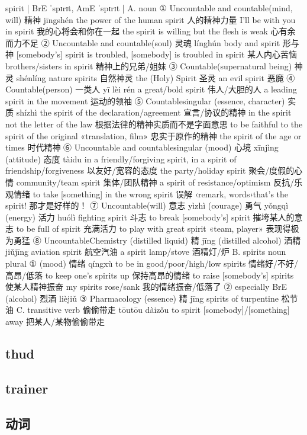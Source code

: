 \documentclass[11pt]{ctexart}
\begin{document}
{{{{spirit | BrE ˈspɪrɪt, AmE ˈspɪrɪt |
A. noun
① Uncountable and countable(mind, will) 精神 jīngshén the power of the human spirit 人的精神力量 I'll be with you in spirit 我的心将会和你在一起 the spirit is willing but the flesh is weak 心有余而力不足
② Uncountable and countable(soul) 灵魂 línghún body and spirit 形与神 [somebody's] spirit is troubled, [somebody] is troubled in spirit 某人内心苦恼 brothers/sisters in spirit 精神上的兄弟/姐妹
③ Countable(supernatural being) 神灵 shénlíng nature spirits 自然神灵 the (Holy) Spirit 圣灵 an evil spirit 恶魔
④ Countable(person) 一类人 yī lèi rén a great/bold spirit 伟人/大胆的人 a leading spirit in the movement 运动的领袖
⑤ Countablesingular (essence, character) 实质 shízhì the spirit of the declaration/agreement 宣言/协议的精神 in the spirit not the letter of the law 根据法律的精神实质而不是字面意思 to be faithful to the spirit of the original «translation, film» 忠实于原作的精神 the spirit of the age or times 时代精神
⑥ Uncountable and countablesingular (mood) 心境 xīnjìng (attitude) 态度 tàidu in a friendly/forgiving spirit, in a spirit of friendship/forgiveness 以友好/宽容的态度 the party/holiday spirit 聚会/度假的心情 community/team spirit 集体/团队精神 a spirit of resistance/optimism 反抗/乐观情绪 to take [something] in the wrong spirit 误解 ‹remark, words›that's the spirit! 那才是好样的！
⑦ Uncountable(will) 意志 yìzhì (courage) 勇气 yǒngqì (energy) 活力 huólì fighting spirit 斗志 to break [somebody's] spirit 摧垮某人的意志 to be full of spirit 充满活力 to play with great spirit «team, player» 表现得极为勇猛
⑧ UncountableChemistry (distilled liquid) 精 jīng (distilled alcohol) 酒精 jiǔjīng aviation spirit 航空汽油 a spirit lamp/stove 酒精灯/炉
B. spirits noun plural
① (mood) 情绪 qíngxù to be in good/poor/high/low spirits 情绪好/不好/高昂/低落 to keep one's spirits up 保持高昂的情绪 to raise [somebody's] spirits 使某人精神振奋 my spirits rose/sank 我的情绪振奋/低落了
② especially BrE (alcohol) 烈酒 lièjiǔ
③ Pharmacology (essence) 精 jīng spirits of turpentine 松节油
C. transitive verb 偷偷带走 tōutōu dàizǒu to spirit [somebody]/[something]
away 把某人/某物偷偷带走

\subsection{thud}
\label{sec:org1751207}
\subsection{trainer}
\label{sec:org623f2ed}
\subsection{动词}
\label{sec:orgb6e3829}

}}}}
\end{document}
